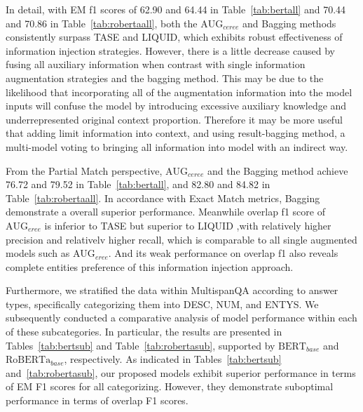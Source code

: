 \documentclass[a4paper,fleqn,twocolumn]{cas-dc}
\newcommand{\1}[1]{\mathds{1}\left[#1\right]}
\begin{document}
	In detail, with EM f1 scores of 62.90 and 64.44 in Table~\ref{tab:bertall} and 70.44 and 70.86 in Table~\ref{tab:robertaall}, both the $\text{AUG}_{ceree}$ and Bagging methods consistently surpass TASE and LIQUID, which exhibits robust effectiveness of information injection strategies. However, there is a little decrease caused by fusing all auxiliary information when contrast with single information augmentation strategies and the bagging method. This may be due to the likelihood that incorporating all of the augmentation information into the model inputs will confuse the model by introducing excessive auxiliary knowledge and underrepresented original context proportion. Therefore it may be more useful that adding limit information into context, and using result-bagging method, a multi-model voting to bringing all information into model with an indirect way.
	
	From the Partial Match perspective, $\text{AUG}_{ceree}$ and the Bagging method achieve 76.72 and 79.52 in Table~\ref{tab:bertall}, and 82.80 and 84.82 in Table~\ref{tab:robertaall}. In accordance with Exact Match metrics, Bagging demonstrate a overall superior performance. Meanwhile overlap f1 score of $\text{AUG}_{eree}$ is inferior to TASE but superior to LIQUID ,with relatively higher precision and relativelv higher recall, which  is comparable to all single augmented models such as $\text{AUG}_{eree}$. And its weak performance on overlap f1 also reveals complete entities preference of this information injection approach.
	
	Furthermore, we stratified the data within MultispanQA according to answer types, specifically categorizing them into DESC, NUM, and ENTYS. We subsequently conducted a comparative analysis of model performance within each of these subcategories. In particular, the results are presented in Tables~\ref{tab:bertsub} and Table~\ref{tab:robertasub}, supported by $\text{BERT}_{base}$ and $\text{RoBERTa}_{base}$, respectively.
	As indicated in Tables~\ref{tab:bertsub} and~\ref{tab:robertasub}, our proposed models exhibit superior performance in terms of EM F1 scores for all categorizing. However, they demonstrate suboptimal performance in terms of overlap F1 scores.
	
\end{document}
